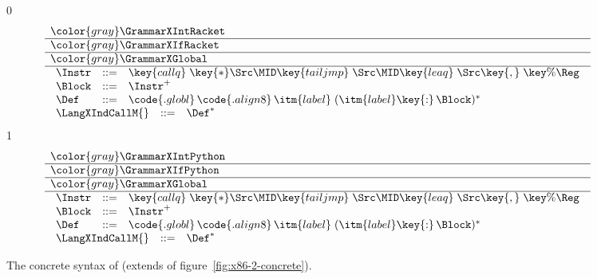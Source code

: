 \documentclass[7x10]{TimesAPriori_MIT}%
\newcommand{\gray}[1]{{\color{gray} #1}}
\def\racketEd{0}
\def\pythonEd{1}
\providecommand{\BookEdition}{1}
\let\edition\BookEdition
\numberwithin{theorem}{chapter}
\numberwithin{definition}{chapter}
\numberwithin{equation}{chapter}
\begin{document}
\newcommand{\GrammarXIndCall}{
\begin{array}{lcl}
\Instr &::=&  \key{callq}\;\key{*}\Src \MID \key{tailjmp}\;\Src 
     \MID \key{leaq}\;\Src\key{,}\;\key{\%}\Reg \\
\Block &::= & \Instr^{+} \\
\Def &::= & \code{.globl}\,\code{.align 8}\,\itm{label}\; (\itm{label}\key{:}\, \Block)^{*} 
\end{array}
}

\newcommand{\ASTXIndCallRacket}{
\begin{array}{lcl}
  \Instr &::=& \INDCALLQ{\Src}{\itm{int}}
    \MID \TAILJMP{\Src}{\itm{int}}\\
    &\MID& \BININSTR{\code{'leaq}}{\Src}{\REG{\Reg}}\\
  \Block &::= & \BLOCK{\itm{info}}{\LP\Instr\ldots\RP}\\
  \Def &::= & \DEF{\itm{label}}{\code{'()}}{\Type}{\itm{info}}{\LP\LP\itm{label}\,\key{.}\,\Block\RP\ldots\RP} 
\end{array}
}

\begin{figure}[tp]
  \begin{tcolorbox}[colback=white]
\small
{\if\edition\racketEd
\[
\begin{array}{l}
  \gray{\GrammarXIntRacket} \\ \hline
  \gray{\GrammarXIfRacket} \\ \hline
  \gray{\GrammarXGlobal} \\ \hline
  \GrammarXIndCall \\
\begin{array}{lcl}
\LangXIndCallM{} &::= & \Def^{*}
\end{array}
\end{array}
\]
\fi}
{\if\edition\pythonEd
\[
\begin{array}{l}
  \gray{\GrammarXIntPython} \\ \hline
  \gray{\GrammarXIfPython} \\ \hline
  \gray{\GrammarXGlobal} \\ \hline
  \GrammarXIndCall \\
\begin{array}{lcl}
\LangXIndCallM{} &::= & \Def^{*}
\end{array}
\end{array}
\]
\fi}
  \end{tcolorbox}

\caption{The concrete syntax of \LangXIndCall{} (extends \LangXGlobal{} of figure~\ref{fig:x86-2-concrete}).}
\label{fig:x86-3-concrete}
\end{figure}
\end{document}
